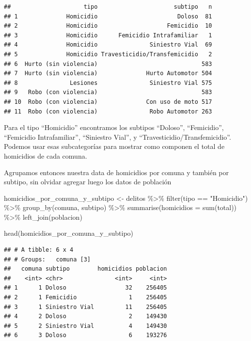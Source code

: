 \documentclass[
]{book}
\newenvironment{Shaded}{\begin{snugshade}}{\end{snugshade}}
\newcommand{\AttributeTok}[1]{\textcolor[rgb]{0.77,0.63,0.00}{#1}}
\newcommand{\FunctionTok}[1]{\textcolor[rgb]{0.00,0.00,0.00}{#1}}
\newcommand{\NormalTok}[1]{#1}
\newcommand{\OtherTok}[1]{\textcolor[rgb]{0.56,0.35,0.01}{#1}}
\newcommand{\SpecialCharTok}[1]{\textcolor[rgb]{0.00,0.00,0.00}{#1}}
\newcommand{\StringTok}[1]{\textcolor[rgb]{0.31,0.60,0.02}{#1}}
\begin{document}
\begin{verbatim}
##                     tipo                      subtipo   n
## 1              Homicidio                       Doloso  81
## 2              Homicidio                    Femicidio  10
## 3              Homicidio      Femicidio Intrafamiliar   1
## 4              Homicidio               Siniestro Vial  69
## 5              Homicidio Travesticidio/Transfemicidio   2
## 6  Hurto (sin violencia)                              583
## 7  Hurto (sin violencia)              Hurto Automotor 504
## 8               Lesiones               Siniestro Vial 575
## 9   Robo (con violencia)                              583
## 10  Robo (con violencia)              Con uso de moto 517
## 11  Robo (con violencia)               Robo Automotor 263
\end{verbatim}

Para el tipo ``Homicidio'' encontramos los subtipos ``Doloso'', ``Femicidio'', ``Femicidio Intrafamiliar'', ``Siniestro Vial'', y ``Travesticidio/Transfemicidio''. Podemos usar esas subcategorías para mostrar como componen el total de homicidios de cada comuna.

Agrupamos entonces nuestra data de homicidios por comuna y también por subtipo, sin olvidar agregar luego los datos de población

\begin{Shaded}
\begin{Highlighting}[]
\NormalTok{homicidios\_por\_comuna\_y\_subtipo }\OtherTok{\textless{}{-}}\NormalTok{ delitos }\SpecialCharTok{\%\textgreater{}\%} 
    \FunctionTok{filter}\NormalTok{(tipo }\SpecialCharTok{==} \StringTok{"Homicidio"}\NormalTok{) }\SpecialCharTok{\%\textgreater{}\%} 
    \FunctionTok{group\_by}\NormalTok{(comuna, subtipo) }\SpecialCharTok{\%\textgreater{}\%} 
    \FunctionTok{summarise}\NormalTok{(}\AttributeTok{homicidios =} \FunctionTok{sum}\NormalTok{(total)) }\SpecialCharTok{\%\textgreater{}\%} 
    \FunctionTok{left\_join}\NormalTok{(poblacion)}

\FunctionTok{head}\NormalTok{(homicidios\_por\_comuna\_y\_subtipo)}
\end{Highlighting}
\end{Shaded}

\begin{verbatim}
## # A tibble: 6 x 4
## # Groups:   comuna [3]
##   comuna subtipo        homicidios poblacion
##    <int> <chr>               <int>     <int>
## 1      1 Doloso                 32    256405
## 2      1 Femicidio               1    256405
## 3      1 Siniestro Vial         11    256405
## 4      2 Doloso                  2    149430
## 5      2 Siniestro Vial          4    149430
## 6      3 Doloso                  6    193276
\end{verbatim}
\end{document}
